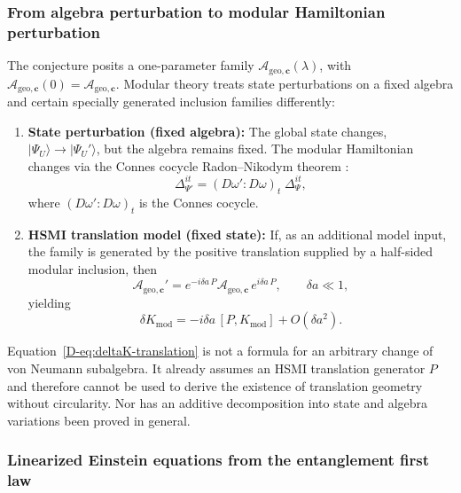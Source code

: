 \documentclass[12pt,a4paper,openany]{book}
\begin{document}
\subsubsection{From algebra perturbation to modular Hamiltonian perturbation}

The conjecture posits a one-parameter family $\mathcal{A}_{\mathrm{geo},\mathbf{c}}(\lambda)$, with $\mathcal{A}_{\mathrm{geo},\mathbf{c}}(0)=\mathcal{A}_{\mathrm{geo},\mathbf{c}}$.  Modular theory treats state perturbations on a fixed algebra and certain specially generated inclusion families differently:

\begin{enumerate}
\item[(a)] \textbf{State perturbation (fixed algebra):} The global state changes, $|\Psi_U\rangle \to |\Psi_U'\rangle$, but the algebra remains fixed.
The modular Hamiltonian changes via the Connes cocycle Radon--Nikodym theorem \cite{Connes1994, Takesaki2003}:
\begin{equation}
\Delta_{\Psi'}^{it} = (D\omega' : D\omega)_t \; \Delta_\Psi^{it},
\end{equation}
where $(D\omega' : D\omega)_t$ is the Connes cocycle.

\item[(b)] \textbf{HSMI translation model (fixed state):} If, as an additional model input, the family is generated by the positive translation supplied by a half-sided modular inclusion, then
\begin{equation}
\mathcal{A}_{\mathrm{geo},\mathbf{c}}' = e^{-i\delta a\, P} \mathcal{A}_{\mathrm{geo},\mathbf{c}}\, e^{i\delta a\, P}, \qquad \delta a \ll 1,
\end{equation}
yielding
\begin{equation}
\label{D-eq:deltaK-translation}
\delta K_{\mathrm{mod}} = -i\delta a\, [P, K_{\mathrm{mod}}] + O(\delta a^2).
\end{equation}
\end{enumerate}

Equation~\eqref{D-eq:deltaK-translation} is not a formula for an arbitrary change of von Neumann subalgebra.  It already assumes an HSMI translation generator $P$ and therefore cannot be used to derive the existence of translation geometry without circularity.  Nor has an additive decomposition into state and algebra variations been proved in general.

\subsubsection{Linearized Einstein equations from the entanglement first law}
\end{document}
